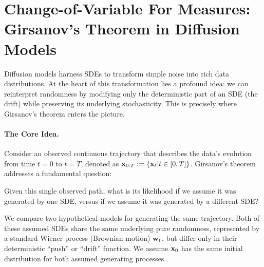 


\newpage

\section{Change-of-Variable For Measures: Girsanov's Theorem in Diffusion Models}
Diffusion models harness SDEs to transform simple noise into rich data distributions. At the heart of this transformation lies a profound idea: we can reinterpret randomness by modifying only the deterministic part of an SDE (the drift) while preserving its underlying stochasticity. This is precisely where Girsanov’s theorem enters the picture.


\paragraph{The Core Idea.}
Consider an observed continuous trajectory that describes the data's evolution from time $t=0$ to $t=T$, denoted as ${\mathbf{x}}_{0:T}:=\{ {\mathbf{x}}_t|t \in [0,T] \}$. Girsanov's theorem addresses a fundamental question:
\begin{question}
    Given this single observed path, what is its likelihood if we assume it was generated by one SDE, versus if we assume it was generated by a different SDE?
\end{question}
We compare two hypothetical models for generating the same trajectory. Both of these assumed SDEs share the same underlying pure randomness, represented by a standard Wiener process (Brownian motion) ${\mathbf{w}}_t$, but differ only in their deterministic ``push'' or ``drift'' function. We assume ${\mathbf{x}}_0$ has the same initial distribution for both assumed generating processes.

